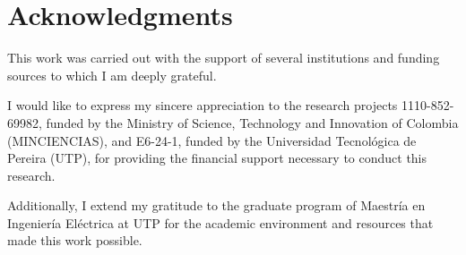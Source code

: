 \documentclass[letterpaper,12pt, oneside]{book}
\begin{document}
\frontmatter
\maketitle



\chapter*{Acknowledgments}

This work was carried out with the support of several institutions and funding sources to which I am deeply grateful. 

I would like to express my sincere appreciation to the research projects 1110-852-69982, funded by the Ministry of Science, Technology and Innovation of Colombia (MINCIENCIAS), and E6-24-1, funded by the Universidad Tecnológica de Pereira (UTP), for providing the financial support necessary to conduct this research. 

Additionally, I extend my gratitude to the graduate program of Maestría en Ingeniería Eléctrica at UTP for the academic environment and resources that made this work possible.



 

\tableofcontents
\listoffigures
\mainmatter


\nocite{Alam_M} 



% 

 



  
    
    



\end{document}
